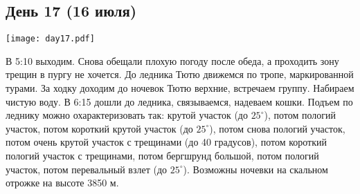 \graphicspath{{Pictures/Chapter5/Day17}}


\subsection{День 17 (16 июля)}\label{subsec:Day17}
    \parbox[c]{\textwidth}{%
        \texttt{[image: day17.pdf]}\label{fig:Day17_map}%
    }
    \vspace{0.8cm}

В 5:10 выходим. Снова обещали плохую погоду после обеда, а проходить зону трещин в пургу не хочется. До ледника Тютю движемся по тропе, маркированной турами. За ходку доходим до ночевок Тютю верхние, встречаем группу. Набираем чистую воду. В 6:15 дошли до ледника, связываемся, надеваем кошки. Подъем по леднику можно охарактеризовать так: крутой участок (до $25^\circ$), потом пологий участок, потом короткий крутой участок (до $25^\circ$), потом снова пологий участок, потом очень крутой участок с трещинами (до 40 градусов), потом короткий  пологий участок с трещинами, потом бергшрунд большой, потом пологий участок, потом перевальный взлет (до $25^\circ$). Возможны ночевки на скальном отрожке на высоте 3850 м.

